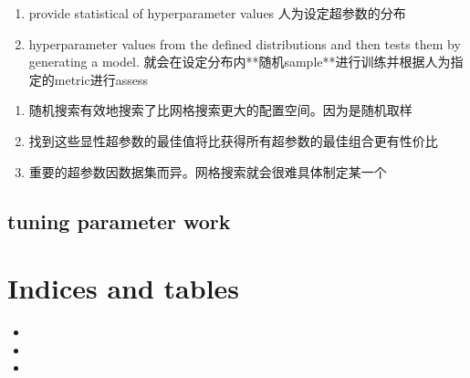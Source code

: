 \documentclass[letterpaper,10pt,english]{sphinxmanual}
\begin{document}
\sphinxAtStartPar
{}
\begin{enumerate}
%
\item {} 
\sphinxAtStartPar
provide statistical  of hyperparameter values 人为设定超参数的分布

\item {} 
\sphinxAtStartPar
{}   hyperparameter values from the defined distributions and then tests them by generating a model.  就会在设定分布内**随机sample**进行训练并根据人为指定的metric进行assess

\end{enumerate}

\sphinxAtStartPar
{}
\begin{enumerate}
%
\item {} 
\sphinxAtStartPar
随机搜索有效地搜索了比网格搜索更大的配置空间。因为是随机取样

\item {} 
\sphinxAtStartPar
找到这些显性超参数的最佳值将比获得所有超参数的最佳组合更有性价比

\item {} 
\sphinxAtStartPar
重要的超参数因数据集而异。网格搜索就会很难具体制定某一个

\end{enumerate}


\section{tuning parameter work}
\label{\detokenize{AI/main:tuning-parameter-work}}
\noindent{}

\noindent{}


\chapter{Indices and tables}
\label{\detokenize{index:indices-and-tables}}\begin{itemize}
\item {} 
\sphinxAtStartPar
{}

\item {} 
\sphinxAtStartPar
{}

\item {} 
\sphinxAtStartPar
{}

\end{itemize}



\renewcommand{\indexname}{索引}
\printindex
\end{document}
